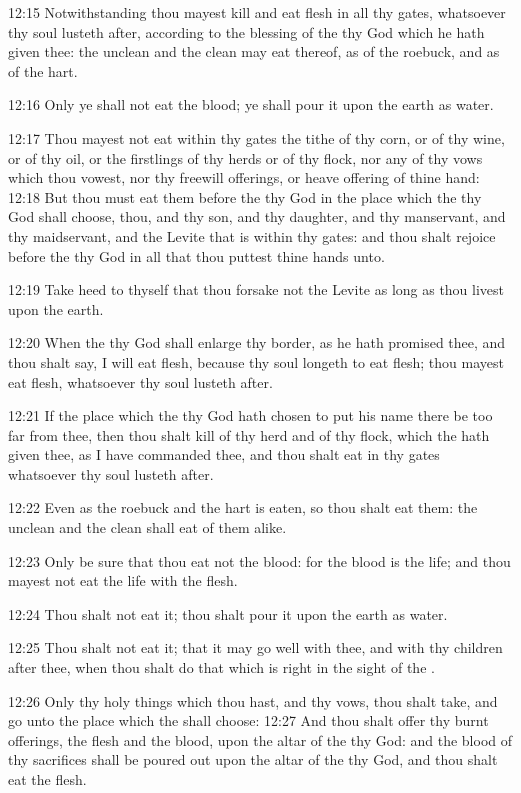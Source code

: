 12:15 Notwithstanding thou mayest kill and eat flesh in all thy gates, whatsoever thy soul lusteth after, according to the blessing of the \LORD thy God which he hath given thee: the unclean and the clean may eat thereof, as of the roebuck, and as of the hart.

12:16 Only ye shall not eat the blood; ye shall pour it upon the earth as water.

12:17 Thou mayest not eat within thy gates the tithe of thy corn, or of thy wine, or of thy oil, or the firstlings of thy herds or of thy flock, nor any of thy vows which thou vowest, nor thy freewill offerings, or heave offering of thine hand: 12:18 But thou must eat them before the \LORD thy God in the place which the \LORD thy God shall choose, thou, and thy son, and thy daughter, and thy manservant, and thy maidservant, and the Levite that is within thy gates: and thou shalt rejoice before the \LORD thy God in all that thou puttest thine hands unto.

12:19 Take heed to thyself that thou forsake not the Levite as long as thou livest upon the earth.

12:20 When the \LORD thy God shall enlarge thy border, as he hath promised thee, and thou shalt say, I will eat flesh, because thy soul longeth to eat flesh; thou mayest eat flesh, whatsoever thy soul lusteth after.

12:21 If the place which the \LORD thy God hath chosen to put his name there be too far from thee, then thou shalt kill of thy herd and of thy flock, which the \LORD hath given thee, as I have commanded thee, and thou shalt eat in thy gates whatsoever thy soul lusteth after.

12:22 Even as the roebuck and the hart is eaten, so thou shalt eat them: the unclean and the clean shall eat of them alike.

12:23 Only be sure that thou eat not the blood: for the blood is the life; and thou mayest not eat the life with the flesh.

12:24 Thou shalt not eat it; thou shalt pour it upon the earth as water.

12:25 Thou shalt not eat it; that it may go well with thee, and with thy children after thee, when thou shalt do that which is right in the sight of the \LORD.

12:26 Only thy holy things which thou hast, and thy vows, thou shalt take, and go unto the place which the \LORD shall choose: 12:27 And thou shalt offer thy burnt offerings, the flesh and the blood, upon the altar of the \LORD thy God: and the blood of thy sacrifices shall be poured out upon the altar of the \LORD thy God, and thou shalt eat the flesh.

